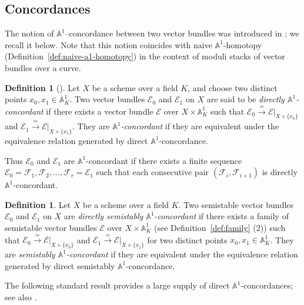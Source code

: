 \documentclass[12pt,reqno]{amsart}
\newcommand{\mc}[1]{\mathcal{#1}}
\newcommand{\bb}[1]{\mathbb{#1}}
\theoremstyle{definition}
\newtheorem{definition}[theorem]{Definition}
\numberwithin{equation}{section}
\begin{document}
	\subsection{Concordances}
	
	The notion of $\bb{A}^1$--concordance between two vector bundles was
	introduced in \cite{AKW17}; we recall it below. Note that this notion
	coincides with naive $\bb{A}^1$-homotopy (Definition~\ref{def:naive-a1-homotopy})
	in the context of moduli stacks of vector bundles over a curve.
	
	\begin{definition}[]\label{def:concordance}
		Let $X$ be a scheme over a field $K$, and choose two distinct points
		$x_0,x_1 \in \bb{A}^1_K$. Two vector bundles $\mc{E}_0$ and $\mc{E}_1$ on
		$X$ are said to be \textit{directly $\bb{A}^1$-concordant} if there exists a vector
		bundle $\mc{E}$ over $X\times \bb{A}^1_K$ such that
		$\mc{E}_0\xrightarrow{\;\simeq\;}\mc{E}|_{X\times\{x_0\}}$ and
		$\mc{E}_1\xrightarrow{\;\simeq\;}\mc{E}|_{X\times\{x_1\}}$. They are
		\textit{$\bb{A}^1$-concordant} if they are equivalent under the equivalence
		relation generated by direct $\bb{A}^1$-concordance.
	\end{definition}
	
	Thus $\mc{E}_0$ and $\mc{E}_1$ are $\bb{A}^1$-concordant if there exists a
	finite sequence $\mc{E}_0=\mc{F}_1, \mc{F}_2, \ldots, \mc{F}_r=\mc{E}_1$
	such that each consecutive pair $(\mc{F}_i,\mc{F}_{i+1})$ is directly
	$\bb{A}^1$-concordant.
	
	\begin{definition}\label{def:ss-concordance}
		Let $X$ be a scheme over a field $K$. Two semistable vector bundles
		$\mc{E}_0$ and $\mc{E}_1$ on $X$ are \textit{directly semistably
			$\bb{A}^1$-concordant} if there exists a family of semistable vector bundles
		$\mc{E}$ over $X\times \bb{A}^1_K$ (see Definition~\ref{def:family} (2))
		such that $\mc{E}_0\xrightarrow{\;\simeq\;} \mc{E}|_{X\times\{x_0\}}$ and
		$\mc{E}_1\xrightarrow{\;\simeq\;} \mc{E}|_{X\times\{x_1\}}$ for two
		distinct points $x_0, x_1 \in \bb{A}^1_K$. They are \textit{semistably
			$\bb{A}^1$-concordant} if they are equivalent under the equivalence relation
		generated by direct semistably $\bb{A}^1$-concordance.
	\end{definition}
	
	The following standard result provides a large supply of direct
	$\bb{A}^1$-concordances; see also \cite[Proposition~2.4]{HY24}.
	
\end{document}
